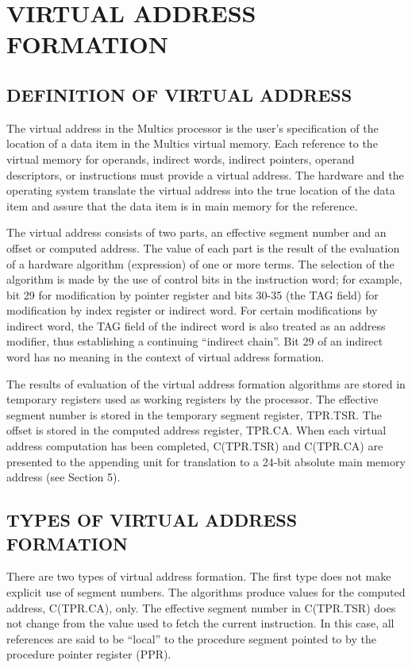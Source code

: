 
\section{VIRTUAL ADDRESS FORMATION}
\label{s6}

\subsection{DEFINITION OF VIRTUAL ADDRESS}

The virtual address in the Multics processor is the user's specification of the
location of a data item in the Multics virtual memory. Each reference to the
virtual memory for operands, indirect words, indirect pointers, operand
descriptors, or instructions must provide a virtual address. The hardware and
the operating system translate the virtual address into the true location of
the data item and assure that the data item is in main memory for the
reference.

The virtual address consists of two parts, an effective segment number and an
offset or computed address. The value of each part is the result of the
evaluation of a hardware algorithm (expression) of one or more terms. The
selection of the algorithm is made by the use of control bits in the
instruction word; for example, bit 29 for modification by pointer register and
bits 30-35 (the TAG field) for modification by index register or indirect word.
For certain modifications by indirect word, the TAG field of the indirect word
is also treated as an address modifier, thus establishing a continuing
{``}indirect chain''. Bit 29 of an indirect word has no meaning in the context
of virtual address formation.


The results of evaluation of the virtual address formation algorithms are
stored in temporary registers used as working registers by the processor. The
effective segment number is stored in the temporary segment register, TPR.TSR.
The offset is stored in the computed address register, TPR.CA. When each
virtual address computation has been completed, C(TPR.TSR) and C(TPR.CA) are
presented to the appending unit for translation to a 24-bit absolute main
memory address (see Section 5).

\subsection{TYPES OF VIRTUAL ADDRESS FORMATION}

There are two types of virtual address formation. The first type does not make
explicit use of segment numbers. The algorithms produce values for the computed
address, C(TPR.CA), only.  The effective segment number in C(TPR.TSR) does not
change from the value used to fetch the current instruction. In this case, all
references are said to be {``}local'' to the procedure segment pointed to by
the procedure pointer register (PPR).


